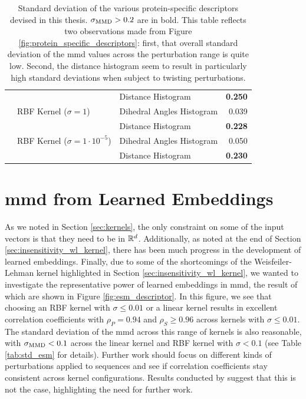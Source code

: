 \begin{table}
{\begin{tabular}{lllr}
                    &             & Distance Histogram &           \textbf{0.250} \\
                    & RBF Kernel ($\sigma=1$) & Dihedral Angles Histogram &           0.039 \\
                    &             & Distance Histogram &           \textbf{0.228} \\
                    & RBF Kernel ($\sigma=1\cdot 10^{-5}$) & Dihedral Angles Histogram &           0.050 \\
                    &             & Distance Histogram &           \textbf{0.230} \\
      \bottomrule
    \end{tabular}
  }
  \caption[Standard deviation of the various protein-specific descriptors
devised in this thesis.]{Standard deviation of the various protein-specific
descriptors devised in this thesis. $\sigma_{\text{MMD}}>0.2$ are in bold. This table
reflects two observations made from Figure
\ref{fig:protein_specific_descriptors}: first, that overall standard deviation
of the \gls{mmd} values across the perturbation range is quite low. Second, the
distance histogram seem to result in particularly high standard deviations when
subject to twisting perturbations.
}
  \label{tab:protein_descriptors_std}
\end{table}

\section{\gls{mmd} from Learned Embeddings}\label{sec:results_esm}

As we noted in Section \ref{sec:kernels}, the only constraint on some of the
input vectors is that they need to be in $\mathbb{R}^d$. Additionally, as noted at the
end of Section \ref{sec:insensitivity_wl_kernel}, there has been much progress
in the development of learned embeddings. Finally, due to some of the
shortcomings of the Weisfeiler-Lehman kernel highlighted in Section
\ref{sec:insensitivity_wl_kernel}, we wanted to investigate the representative
power of learned embeddings in \gls{mmd}, the result of which are shown in Figure
\ref{fig:esm_descriptor}. In this figure, we see that choosing an RBF kernel
with $\sigma\leq 0.01$ or a linear kernel results in excellent correlation
coefficients with $\rho_P=0.94$ and $\rho_S\geq 0.96$ across kernels with
$\sigma\leq 0.01$. The standard deviation of the \gls{mmd} across this range of
kernels is also reasonable, with $\sigma_{\text{MMD}}<0.1$ across the linear kernel and
RBF kernel with $\sigma<0.1$ (see Table \ref{tab:std_esm} for details). Further
work should focus on different kinds of perturbations applied to sequences and
see if correlation coefficients stay consistent across kernel configurations.
Results conducted by \cite{kucera2022conditional} suggest that this is not the
case, highlighting the need for further work.


